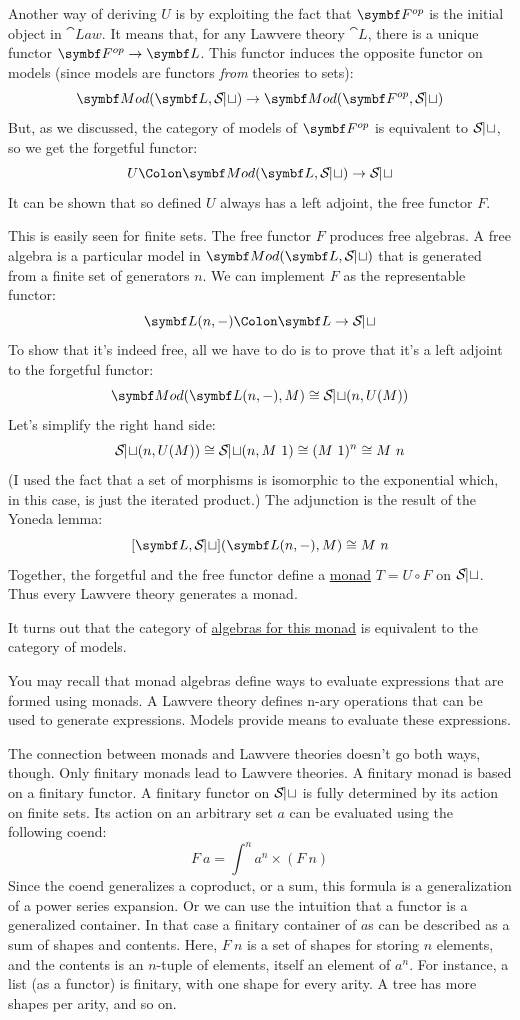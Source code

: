 Another way of deriving $U$ is by exploiting the fact that
$\Fop$ is the initial object in $\cat{Law}$. It
means that, for any Lawvere theory $\cat{L}$, there is a unique
functor $\Fop \to \cat{L}$. This functor induces the
opposite functor on models (since models are functors \emph{from}
theories to sets):
\[\cat{Mod}(\cat{L}, \Set) \to \cat{Mod}(\Fop, \Set)\]
But, as we discussed, the category of models of
$\Fop$ is equivalent to $\mathcal{S\mkern-3mu et}$, so we get
the forgetful functor:
\[U \Colon \cat{Mod}(\cat{L}, \Set) \to \Set\]
It can be shown that so defined $U$ always has a left adjoint,
the free functor $F$.

This is easily seen for finite sets. The free functor $F$
produces free algebras. A free algebra is a particular model in
$\cat{Mod}(\cat{L}, \Set)$ that is generated from a finite set of generators
$n$. We can implement $F$ as the representable functor:
\[\cat{L}(n, -) \Colon \cat{L} \to \Set\]
To show that it's indeed free, all we have to do is to prove that it's a
left adjoint to the forgetful functor:
\[\cat{Mod}(\cat{L}(n, -), M) \cong \Set(n, U(M))\]
Let's simplify the right hand side:
\[\mathcal{S\mkern-3mu et}(n, U(M)) \cong \mathcal{S\mkern-3mu et}(n, M\ 1) \cong (M\ 1)^n \cong M\ n\]
(I used the fact that a set of morphisms is isomorphic to the
exponential which, in this case, is just the iterated product.) The
adjunction is the result of the Yoneda lemma:
\[[\cat{L}, \Set](\cat{L}(n, -), M) \cong M\ n\]
Together, the forgetful and the free functor define a
\hyperref[monads-categorically]{monad}
$T = U \circ F$ on $\mathcal{S\mkern-3mu et}$. Thus every Lawvere theory generates
a monad.

It turns out that the category of
\hyperref[algebras-for-monads]{algebras
for this monad} is equivalent to the category of models.

You may recall that monad algebras define ways to evaluate expressions
that are formed using monads. A Lawvere theory defines n-ary operations
that can be used to generate expressions. Models provide means to
evaluate these expressions.

The connection between monads and Lawvere theories doesn't go both ways,
though. Only finitary monads lead to Lawvere theories. A finitary monad
is based on a finitary functor. A finitary functor on $\mathcal{S\mkern-3mu et}$ is
fully determined by its action on finite sets. Its action on an
arbitrary set $a$ can be evaluated using the following coend:
\[F\ a = \int^n a^n \times (F\ n)\]
Since the coend generalizes a coproduct, or a sum, this formula is a
generalization of a power series expansion. Or we can use the intuition
that a functor is a generalized container. In that case a finitary
container of $a$s can be described as a sum of shapes and
contents. Here, $F\ n$ is a set of shapes for storing $n$ elements,
and the contents is an $n$-tuple of elements, itself an element of
$a^n$. For instance, a list (as a functor) is finitary, with one
shape for every arity. A tree has more shapes per arity, and so on.

